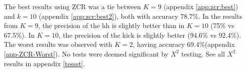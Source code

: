 %			
%			
		

		The best results using ZCR was a tie between $K=9$ (appendix \ref{app:zcr:best}) and $k=10$ (appendix \ref{app:zcr:best2}), both with accuracy 78.7\%. In the results from $K=9$, the precision of the hh is slightly better than in $K=10$ (75\% vs 67.5\%). In $K=10$, the precision of the kick is slightly better (94.6\% vs 92.4\%). The worst results was observed with $K=2$, having accuracy 69.4\%(appendix \ref{app-ZCR-Worst}). No tests were deemed significant by $X^2$ testing. See all $X^2$ results in appendix \ref{tessst}.
		
		
